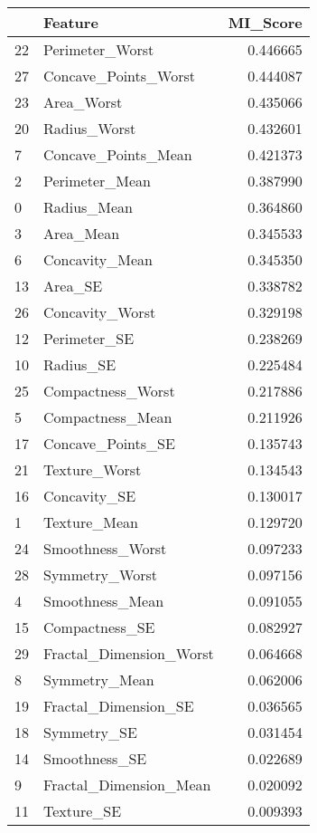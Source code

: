 \begin{tabular}{llr}
\toprule
 & Feature & MI_Score \\
\midrule
22 & Perimeter_Worst & 0.446665 \\
27 & Concave_Points_Worst & 0.444087 \\
23 & Area_Worst & 0.435066 \\
20 & Radius_Worst & 0.432601 \\
7 & Concave_Points_Mean & 0.421373 \\
2 & Perimeter_Mean & 0.387990 \\
0 & Radius_Mean & 0.364860 \\
3 & Area_Mean & 0.345533 \\
6 & Concavity_Mean & 0.345350 \\
13 & Area_SE & 0.338782 \\
26 & Concavity_Worst & 0.329198 \\
12 & Perimeter_SE & 0.238269 \\
10 & Radius_SE & 0.225484 \\
25 & Compactness_Worst & 0.217886 \\
5 & Compactness_Mean & 0.211926 \\
17 & Concave_Points_SE & 0.135743 \\
21 & Texture_Worst & 0.134543 \\
16 & Concavity_SE & 0.130017 \\
1 & Texture_Mean & 0.129720 \\
24 & Smoothness_Worst & 0.097233 \\
28 & Symmetry_Worst & 0.097156 \\
4 & Smoothness_Mean & 0.091055 \\
15 & Compactness_SE & 0.082927 \\
29 & Fractal_Dimension_Worst & 0.064668 \\
8 & Symmetry_Mean & 0.062006 \\
19 & Fractal_Dimension_SE & 0.036565 \\
18 & Symmetry_SE & 0.031454 \\
14 & Smoothness_SE & 0.022689 \\
9 & Fractal_Dimension_Mean & 0.020092 \\
11 & Texture_SE & 0.009393 \\
\bottomrule
\end{tabular}
